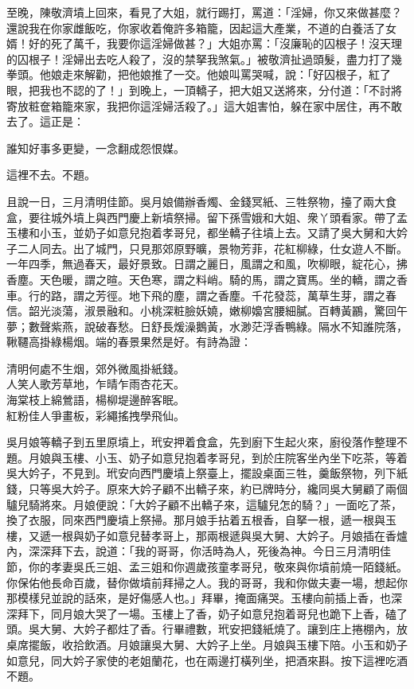 至晚，陳敬濟墳上回來，看見了大姐，就行踢打，罵道：「淫婦，你又來做甚麼？還說我在你家雌飯吃，你家收着俺許多箱籠，因起這大產業，不道的白養活了女婿！好的死了萬千，我要你這淫婦做甚？」大姐亦罵：「沒廉恥的囚根子！沒天理的囚根子！淫婦出去吃人殺了，沒的禁拏我煞氣。」被敬濟扯過頭髮，盡力打了幾拳頭。他娘走來解勸，把他娘推了一交。他娘叫罵哭喊，說：「好囚根子，紅了眼，把我也不認的了！」到晚上，一頂轎子，把大姐又送將來，分付道：「不討將寄放粧奩箱籠來家，我把你這淫婦活殺了。」{}這大姐害怕，躲在家中居住，再不敢去了。這正是：

\begin{myquote}
誰知好事多更變，一念翻成怨恨媒。
\end{myquote}

這裡不去。不題。

且說一日，三月清明佳節。吳月娘備辦香燭、金錢冥紙、三牲祭物，擡了兩大食盒，要往城外墳上與西門慶上新墳祭掃。留下孫雪娥和大姐、衆丫頭看家。帶了孟玉樓和小玉，並奶子如意兒抱着孝哥兒，都坐轎子往墳上去。又請了吳大舅和大妗子二人同去。出了城門，只見那郊原野曠，景物芳菲，花紅柳綠，仕女遊人不斷。一年四季，無過春天，最好景致。{}日謂之麗日，風謂之和風，吹柳眼，綻花心，拂香塵。天色暖，謂之暄。天色寒，謂之料峭。騎的馬，謂之寶馬。坐的轎，謂之香車。行的路，謂之芳徑。地下飛的塵，謂之香塵。千花發蕊，萬草生芽，謂之春信。韶光淡蕩，淑景融和。小桃深粧臉妖嬈，嫩柳嬝宮腰細膩。百轉黃鸝，驚回午夢；數聲紫燕，說破春愁。日舒長煖澡鵝黃，水渺茫浮香鴨綠。隔水不知誰院落，鞦韆高掛綠楊烟。端的春景果然是好。有詩為證：

\begin{myquote}
清明何處不生烟，郊外微風掛紙錢。\\人笑人歌芳草地，乍晴乍雨杏花天。\\海棠枝上綿鶯語，楊柳堤邊醉客眠。\\紅粉佳人爭畫板，彩繩搖拽學飛仙。
\end{myquote}

吳月娘等轎子到五里原墳上，玳安押着食盒，先到廚下生起火來，{}廚役落作整理不題。月娘與玉樓、小玉、奶子如意兒抱着孝哥兒，到於庄院客坐內坐下吃茶，等着吳大妗子，不見到。玳安向西門慶墳上祭臺上，擺設桌面三牲，羹飯祭物，列下紙錢，只等吳大妗子。原來大妗子顧不出轎子來，約已牌時分，纔同吳大舅顧了兩個驢兒騎將來。{}月娘便說：「大妗子顧不出轎子來，這驢兒怎的騎？」一面吃了茶，換了衣服，同來西門慶墳上祭掃。那月娘手拈着五根香，自拏一根，遞一根與玉樓，又遞一根與奶子如意兒替孝哥上，那兩根遞與吳大舅、大妗子。月娘插在香爐內，深深拜下去，說道：「我的哥哥，你活時為人，死後為神。今日三月清明佳節，你的孝妻吳氏三姐、孟三姐和你週歲孩童孝哥兒，敬來與你墳前燒一陌錢紙。你保佑他長命百歲，替你做墳前拜掃之人。我的哥哥，我和你做夫妻一場，想起你那模樣兒並說的話來，是好傷感人也。」拜畢，掩面痛哭。玉樓向前插上香，也深深拜下，同月娘大哭了一場。玉樓上了香，奶子如意兒抱着哥兒也跪下上香，磕了頭。吳大舅、大妗子都炷了香。行畢禮數，玳安把錢紙燒了。讓到庄上捲棚內，放桌席擺飯，收拾飲酒。月娘讓吳大舅、大妗子上坐。月娘與玉樓下陪。小玉和奶子如意兒，同大妗子家使的老姐蘭花，也在兩邊打橫列坐，把酒來斟。按下這裡吃酒不題。


